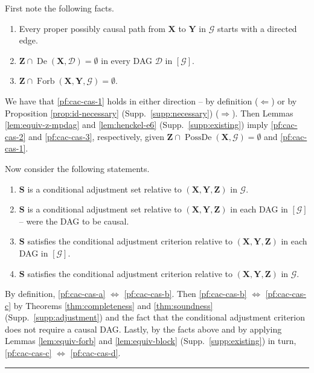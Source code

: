 \documentclass[twoside]{article}
\DeclareMathOperator{\De}{De}
\DeclareMathOperator{\PossDe}{PossDe}
\DeclareMathOperator{\Forb}{Forb}
\newcommand{\fb}[2][X,Y]{\Forb(\mb{#1},#2)}
\newcommand{\mb}[1]{\mathbf{#1}}
\newcommand{\g}[1][G]{\mathcal{#1}}
\newenvironment{proofof}[1][]{\begin{trivlist}
\item[\hskip \labelsep {\bfseries Proof of #1.}]}{\hfill\BlackBox\end{trivlist}}
\newcommand{\BlackBox}{\rule{1.5ex}{1.5ex}}
\begin{document}
\begin{proofof}[Theorem \ref{thm:cac-cas}]
    First note the following facts. 
    \begin{enumerate}[label=(\roman*)]
        \item Every proper possibly causal path from $\mb{X}$ to $\mb{Y}$ in $\g$ starts with a directed edge. \label{pf:cac-cas-1}
        \item $\mb{Z} \cap \De(\mb{X},\g[D]) = \emptyset$ in every DAG $\g[D]$ in $[\g]$. \label{pf:cac-cas-2} 
        \item $\mb{Z} \cap \fb{\g} = \emptyset$. \label{pf:cac-cas-3} 
    \end{enumerate}

    We have that \ref{pf:cac-cas-1} holds in either direction -- by definition ($\Leftarrow$) or by Proposition \ref{prop:id-necessary} (Supp.\ \ref{supp:necessary}) ($\Rightarrow$). Then Lemmas \ref{lem:equiv-z-mpdag} and \ref{lem:henckel-e6} (Supp.\ \ref{supp:existing}) imply \ref{pf:cac-cas-2} and \ref{pf:cac-cas-3}, respectively, given $\mb{Z} \cap \PossDe(\mb{X},\g) = \emptyset$ and \ref{pf:cac-cas-1}.
    
    Now consider the following statements.
    \begin{enumerate}[label=(\alph*)]
        \item $\mb{S}$ is a conditional adjustment set relative to $(\mb{X},\mb{Y},\mb{Z})$ in $\g$. \label{pf:cac-cas-a}

        \item $\mb{S}$ is a conditional adjustment set relative to $(\mb{X},\mb{Y},\mb{Z})$ in each DAG in $[\g]$ -- were the DAG to be causal.\label{pf:cac-cas-b}
        
        \item $\mb{S}$ satisfies the conditional adjustment criterion relative to $(\mb{X,Y,Z})$ in each DAG in $[\g]$. \label{pf:cac-cas-c}
        
        \item $\mb{S}$ satisfies the conditional adjustment criterion relative to $(\mb{X,Y,Z})$ in $\g$. \label{pf:cac-cas-d}
    \end{enumerate}

    By definition, \ref{pf:cac-cas-a} $\Leftrightarrow$ \ref{pf:cac-cas-b}. Then \ref{pf:cac-cas-b} $\Leftrightarrow$ \ref{pf:cac-cas-c} by Theorems \ref{thm:completeness} and \ref{thm:soundness} (Supp.\ \ref{supp:adjustment}) and the fact that the conditional adjustment criterion does not require a causal DAG. Lastly, by the facts above and by applying Lemmas \ref{lem:equiv-forb} and \ref{lem:equiv-block} (Supp.\ \ref{supp:existing}) in turn, \ref{pf:cac-cas-c} $\Leftrightarrow$ \ref{pf:cac-cas-d}. 
\end{proofof}
\end{document}
